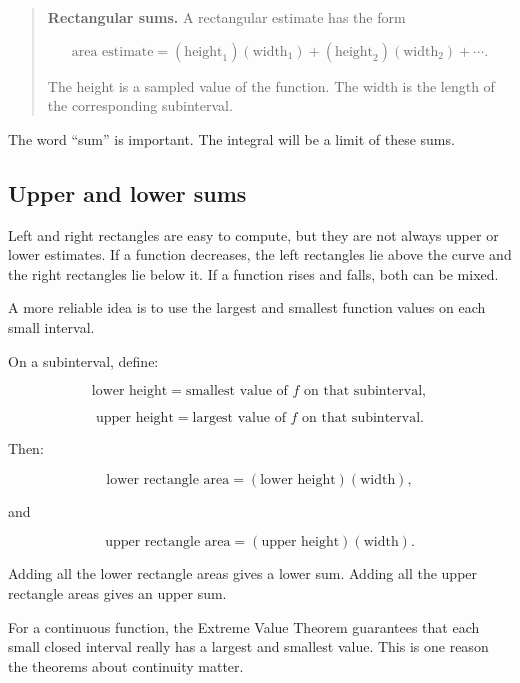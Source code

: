 \begin{quote}
\textbf{Rectangular sums.}
A rectangular estimate has the form

\[
\text{area estimate}
=
(\text{height}_1)(\text{width}_1)
+
(\text{height}_2)(\text{width}_2)
+
\cdots.
\]

The height is a sampled value of the function.  The width is the length of the
corresponding subinterval.
\end{quote}

The word ``sum'' is important.  The integral will be a limit of these sums.

\subsection{Upper and lower sums}
\label{subsec:upper-lower-sums}

Left and right rectangles are easy to compute, but they are not always upper or lower
estimates.  If a function decreases, the left rectangles lie above the curve and the right
rectangles lie below it.  If a function rises and falls, both can be mixed.

A more reliable idea is to use the largest and smallest function values on each small
interval.

On a subinterval, define:

\[
\text{lower height}=\text{smallest value of }f\text{ on that subinterval},
\]

\[
\text{upper height}=\text{largest value of }f\text{ on that subinterval}.
\]

Then:

\[
\text{lower rectangle area}
=
(\text{lower height})(\text{width}),
\]

and

\[
\text{upper rectangle area}
=
(\text{upper height})(\text{width}).
\]

Adding all the lower rectangle areas gives a lower sum.  Adding all the upper
rectangle areas gives an upper sum.

For a continuous function, the Extreme Value Theorem guarantees that each small
closed interval really has a largest and smallest value.  This is one reason the
theorems about continuity matter.

